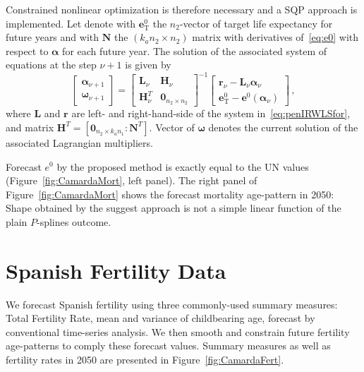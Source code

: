 \documentclass[twoside]{report}
\begin{document}
Constrained nonlinear optimization is therefore necessary and a SQP approach is implemented. Let denote with $\bm{e}^{0}_{\mathrm{T}}$ the $n_{2}$-vector of target life expectancy for future years and with $\bm{N}$ the $(k_{a}n_{2} \times n_{2})$ matrix with derivatives of~\eqref{eq:e0} with respect to $\bm{\alpha}$ for each future year. The solution of the associated system of equations at the step $\nu + 1$ is given by
\begin{equation}\label{eq:SQLalg}
\left[ \begin{array}{l}
\bm{\alpha}_{\nu+1}\\
\bm{\omega}_{\nu+1}
\end{array}\right] = 
\left[ \begin{array}{cl}
\bm{L}_{\nu}& \bm{H}_{\nu}\\
\bm{H}_{\nu}^{T} & \bm{0}_{n_{2} \times n_{2}}
\end{array}\right]^{-1}
\left[ \begin{array}{c}
\bm{r}_{\nu} - \bm{L}_{\nu}\bm{\alpha}_{\nu}\\
\bm{e}^{0}_{\mathrm{T}} - \bm{e}^{0} (\bm{\alpha}_{\nu})
\end{array}\right] \, ,
\end{equation}
where $\bm{L}$ and $\bm{r}$ are left- and right-hand-side of the system in~\eqref{eq:penIRWLSfor}, and matrix $\bm{H}^{T} = \left[\bm{0}_{n_{2}\times k_{a}n_{1}}:\bm{N}^{T}\right]$. Vector of $\bm{\omega}$ denotes the current solution of the associated Lagrangian multipliers.

Forecast $e^{0}$ by the proposed method is exactly equal to the UN values (Figure~\ref{fig:CamardaMort}, left panel). The right panel of Figure~\ref{fig:CamardaMort} shows the forecast mortality age-pattern in 2050: Shape obtained by the suggest approach is not a simple linear function of the plain $P$-splines outcome.

\section{Spanish Fertility Data}

We forecast Spanish fertility using three commonly-used summary measures: Total Fertility Rate, mean and variance of childbearing age, forecast by conventional time-series analysis. We then smooth and constrain future fertility age-patterns to comply these forecast values. Summary measures as well as fertility rates in 2050 are presented in Figure~\ref{fig:CamardaFert}. 
\end{document}
